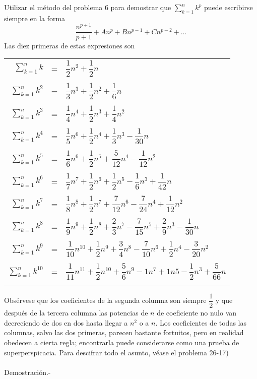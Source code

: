 \begin{teo}
Utilizar el método del problema 6 para demostrar que $\displaystyle\sum_{k=1}^n k^p$ puede escribirse siempre en la forma $$\dfrac{n^{p+1}}{p+1} + An^p + Bn^{p-1} + Cn^{p-2} + ...$$
Las diez primeras de estas expresiones son
\begin{center}
\begin{tabular}{r c l}
$\displaystyle\sum_{k=1}^n k$&=&$\dfrac{1}{2}n^2 + \dfrac{1}{2}n$\\\\
$\displaystyle\sum_{k=1}^n k^2$&=&$\dfrac{1}{3} n^3 + \dfrac{1}{2}n^2 + \dfrac{1}{6}n$\\\\
$\displaystyle\sum_{k=1}^n k^3$&=&$\dfrac{1}{4}n^4 + \dfrac{1}{2} n^3 + \dfrac{1}{4} n^2$\\\\
$\displaystyle\sum_{k=1}^n k^4$&=&$\dfrac{1}{5} n^6 + \dfrac{1}{2} n^4 + \dfrac{1}{3} n^3 - \dfrac{1}{30}n$\\\\
$\displaystyle\sum_{k=1}^n k^5$&=&$\dfrac{1}{6}n^6 + \dfrac{1}{2} n^5 + \dfrac{5}{12}n^4 - \dfrac{1}{12}n^2$\\\\
$\displaystyle\sum_{k=1}^n k^6$&=&$\dfrac{1}{7}n^7 + \dfrac{1}{2}n^6 + \dfrac{1}{2}n^5 - \dfrac{1}{6}n^3 + \dfrac{1}{42}n$\\\\
$\displaystyle\sum_{k=1}^n k^7$&=&$\dfrac{1}{8}n^8 + \dfrac{1}{2}n^7 + \dfrac{7}{12}n^6 - \dfrac{7}{24}n^4 + \dfrac{1}{12}n^2$\\\\
$\displaystyle\sum_{k=1}^n k^8$&=&$\dfrac{1}{9}n^9 + \dfrac{1}{2}n^8 + \dfrac{2}{3}n^7 - \dfrac{7}{15}n^5 + \dfrac{2}{9}n^3 - \dfrac{1}{30}n$\\\\
$\displaystyle\sum_{k=1}^n k^9$&=&$\dfrac{1}{10}n^{10} + \dfrac{1}{2} n^9 + \dfrac{3}{4}n^8 - \dfrac{7}{10}n^6 + \dfrac{1}{2}n^4 - \dfrac{3}{20} n^2$\\\\
$\displaystyle\sum_{k=1}^n k^10$&=&$\dfrac{1}{11}n^{11} + \dfrac{1}{2}n^{10} + \dfrac{5}{6}n^9 - 1n^7 + 1n5 - \dfrac{1}{2}n^3 + \dfrac{5}{66}n$\\\\
\end{tabular}
\end{center}
Obsérvese que los coeficientes de la segunda columna son siempre $\dfrac{1}{2}$ y que después de la tercera columna las potencias de $n$ de coeficiente no nulo van decreciendo de dos en dos hasta llegar a $n^2$ o a $n$. Los coeficientes de todas las columnas, salvo las dos primeras, parecen bastante fortuitos, pero en realidad obedecen a cierta regla; encontrarla puede considerarse como una prueba de superperspicacia. Para descifrar todo el asunto, véase el problema 26-17)\\\\
Demostración.- \; 
\end{teo} 

